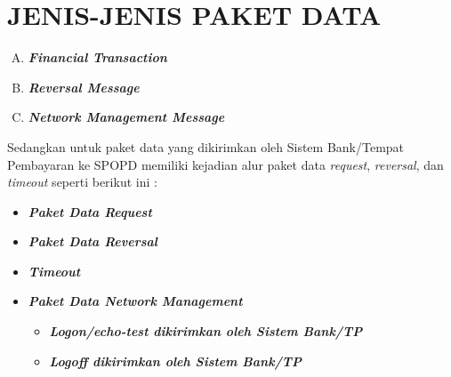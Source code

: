 \chapter{JENIS-JENIS PAKET DATA}

\begin{enumerate}[A.]

  \item \textbf{\textit{Financial Transaction}}
  
  \item \textbf{\textit{Reversal Message}}
  
  \item \textbf{\textit{Network Management Message}}

\end{enumerate}

Sedangkan untuk paket data yang dikirimkan oleh Sistem Bank/Tempat Pembayaran ke SPOPD memiliki kejadian alur paket data \textit{request}, \textit{reversal}, dan \textit{timeout} seperti berikut ini :

\begin{itemize}

  \item \textbf{\textit{Paket Data Request}}
  
  \item \textbf{\textit{Paket Data Reversal}}
  
  \item \textbf{\textit{Timeout}}
  
  \item \textbf{\textit{Paket Data Network Management}}
  
  \begin{itemize}
    \item \textbf{\textit{Logon/echo-test dikirimkan oleh Sistem Bank/TP}}
    \item \textbf{\textit{Logoff dikirimkan oleh Sistem Bank/TP}}
  \end{itemize}

\end{itemize}
